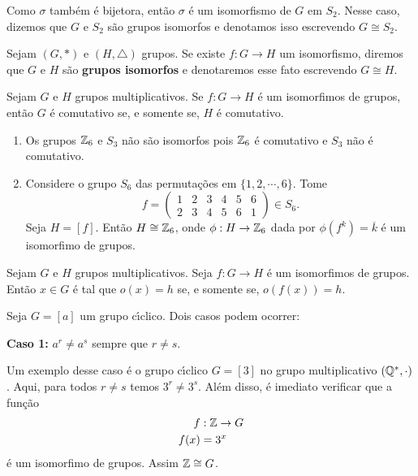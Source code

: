 \vspace{.3cm}

Como $\sigma$ tamb\'em \'e bijetora, ent\~ao $\sigma$ \'e um isomorfismo de $G$ em $S_2$. Nesse caso, dizemos que $G$ e $S_2$ s\~ao grupos isomorfos e denotamos isso escrevendo $G \cong S_2$.

\begin{definicao}
    Sejam $(G, *)$ e $(H, \triangle)$ grupos. Se existe $f : G \to H$ um isomorfismo, diremos que $G$ e $H$ s\~ao \textbf{grupos isomorfos} e denotaremos esse fato escrevendo $G \cong H$.
\end{definicao}

\begin{proposicao}
    Sejam $G$ e $H$ grupos multiplicativos. Se $f : G \to H$ \'e um isomorfimos de grupos, ent\~ao $G$ \'e comutativo se, e somente se, $H$ \'e comutativo.
\end{proposicao}

\begin{exemplos}
    \begin{enumerate}[label={\arabic*})]
        \item Os grupos $\mathbb{Z}_6$ e $S_3$ n\~ao s\~ao isomorfos pois $\mathbb{Z}_6$ \'e comutativo e $S_3$ n\~ao \'e comutativo.

        \item Considere o grupo $S_6$ das permuta\c{c}\~oes em $\{1, 2, \cdots, 6\}$. Tome
        \[
            f = \begin{pmatrix}
                1 & 2 & 3 & 4 & 5 & 6\\
                2 & 3 & 4 & 5 & 6 & 1
            \end{pmatrix} \in S_6.
        \]
        Seja $H = [f]$. Ent\~ao $H \cong \mathbb{Z}_6$, onde $\phi : H \to \mathbb{Z}_6$ dada por $\phi(f^k) = \overline{k}$ \'e um isomorfimo de grupos.
    \end{enumerate}
\end{exemplos}

\begin{proposicao}
    Sejam $G$ e $H$ grupos multiplicativos. Seja $f : G \to H$ \'e um isomorfimos de grupos. Ent\~ao $x \in G$ \'e tal que $o(x) = h$ se, e somente se, $o(f(x)) = h$.
\end{proposicao}

Seja $G = [a]$ um grupo c{\'\i}clico. Dois casos podem ocorrer:

\textbf{Caso 1:} $a^r \ne a^s$ sempre que $r \ne s$.

Um exemplo desse caso \'e o grupo c{\'\i}clico $G = [3]$ no grupo multiplicativo $(\mathbb{Q}^*, \cdot)$. Aqui, para todos $r \ne s$ temos $3^r \ne 3^s$. Al\'em disso, \'e imediato verificar que a fun\c{c}\~ao
\begin{align*}
	f &: \mathbb{Z} \to G\\
	f(x) &= 3^x
\end{align*}
\'e um isomorfimo de grupos. Assim $\mathbb{Z} \cong G$.


